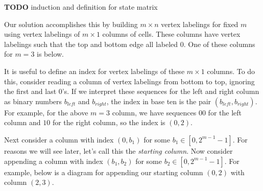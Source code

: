 \documentclass[12pt]{article}
\theoremstyle{plain}
\theoremstyle{definition}
\theoremstyle{remark}
\theoremstyle{definition}
\newcommand{\cell}[4]{ \draw[thick] ( #1 , #2 ) rectangle ( #3 , #4 );}
\newcommand{\lablnode}[3]{\node[shape=circle,draw=none,fill=none, inner sep=0pt,minimum size=0pt] (A) at ( #1 , #2 ) {#3};}
\newcommand{\lablvertex}[3]{\node[shape=circle,draw=none,fill=white, inner sep=2pt,minimum size=5pt] (A) at ( #1 , #2 ) {#3};}
\begin{document}
\textbf{TODO} induction and definition for state matrix

Our solution accomplishes this by building $m \times n$ vertex labelings for fixed $m$ using vertex labelings of $m \times 1$ columns of cells. These columns have vertex labelings such that the top and bottom edge all labeled $0$. One of these columns for $m=3$ is below.

\begin{center}
\end{center}

It is useful to define an index for vertex labelings of these $m \times 1$ columns. To do this, consider reading a column of vertex labelings from bottom to top, ignoring the first and last $0$'s. If we interpret these sequences for the left and right column as binary numbers $b_{left}$ and $b_{right}$, the index in base ten is the pair $(b_{left}, b_{right})$. For example, for the above $m=3$ column, we have sequences $00$ for the left column and $10$ for the right column, so the index is $(0,2)$.

Next consider a column with index $(0, b_{1})$ for some $b_{1} \in [0,2^{m-1}-1]$. For reasons we will see later, let's call this the \textit{starting column}. Now consider appending a column with index $(b_{1}, b_{2})$ for some $b_{2} \in [0,2^{m-1}-1]$. For example, below is a diagram for appending our starting column $(0,2)$ with column $(2,3)$. 
\end{document}
